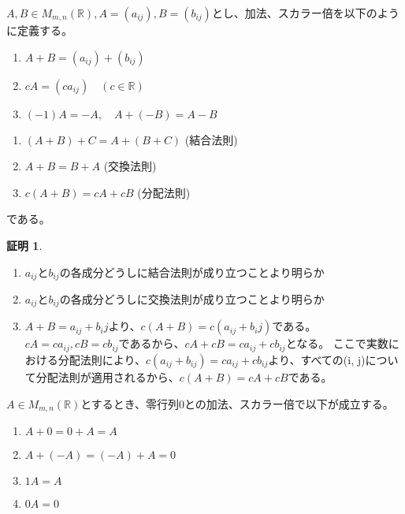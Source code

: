 \documentclass[dvipdfmx,autodetect-engine]{jsarticle}
\theoremstyle{definition}
\newtheorem*{Proof*}{証明}
\begin{document}
\label{defi:additionAndScalarMultiple}

$A, B \in M_{m,n}(\mathbb{R}), A = (a_{ij}), B = (b_{ij})$とし、加法、スカラー倍を以下のように定義する。

\begin{enumerate}
\renewcommand{\labelenumi}{(\arabic{enumi})}
\item $A + B = (a_{ij}) + (b_{ij})$
\item $cA = (ca_{ij}) \quad (c \in \mathbb{R})$
\item $(-1)A = -A, \quad A + (-B) = A - B$
\end{enumerate}


\begin{enumerate}
\renewcommand{\labelenumi}{(\arabic{enumi})}
\item $(A + B) + C = A + (B + C)$ \quad (結合法則)
\item $A + B = B + A$ \quad (交換法則)
\item $c(A+B) = cA + cB$ \quad (分配法則)
\end{enumerate}

である。

\begin{Proof*}
\begin{enumerate}
\renewcommand{\labelenumi}{(\arabic{enumi})}
\item $a_{ij}とb_{ij}の各成分どうしに結合法則が成り立つことより明らか$
\item $a_{ij}とb_{ij}の各成分どうしに交換法則が成り立つことより明らか$
\item $A + B = a_{ij} + b_ij$より、$c(A + B) = c(a_{ij} + b_ij)$である。
$cA = ca_{ij}, cB = cb_{ij}$であるから、$cA + cB = ca_{ij} + cb_{ij}$となる。
ここで実数における分配法則により、$c(a_{ij} + b_{ij}) = ca_{ij} + cb_{ij}$より、すべての(i, j)について分配法則が適用されるから、$c(A+B) = cA + cB$である。
\end{enumerate}
\end{Proof*}


$A \in M_{m,n}(\mathbb{R})$とするとき、零行列$0$との加法、スカラー倍で以下が成立する。

\begin{enumerate}
\renewcommand{\labelenumi}{(\arabic{enumi})}
\item $A + 0 = 0 + A = A$
\item $A + (-A) = (-A) + A = 0$
\item $1A = A$
\item $0A = 0$
\end{enumerate}
\end{document}
